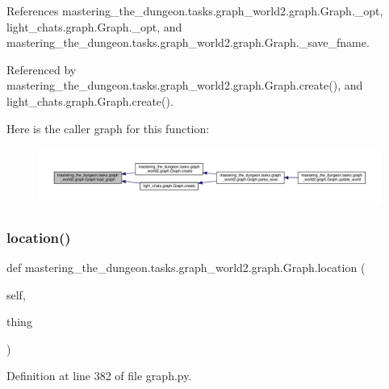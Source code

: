 References mastering\+\_\+the\+\_\+dungeon.\+tasks.\+graph\+\_\+world2.\+graph.\+Graph.\+\_\+opt, light\+\_\+chats.\+graph.\+Graph.\+\_\+opt, and mastering\+\_\+the\+\_\+dungeon.\+tasks.\+graph\+\_\+world2.\+graph.\+Graph.\+\_\+save\+\_\+fname.



Referenced by mastering\+\_\+the\+\_\+dungeon.\+tasks.\+graph\+\_\+world2.\+graph.\+Graph.\+create(), and light\+\_\+chats.\+graph.\+Graph.\+create().

Here is the caller graph for this function\+:
\nopagebreak
\begin{figure}[H]
\begin{center}
\leavevmode
\includegraphics[width=350pt]{classmastering__the__dungeon_1_1tasks_1_1graph__world2_1_1graph_1_1Graph_a99a3f4950b15400d0cc3d588302b8f84_icgraph}
\end{center}
\end{figure}
\mbox{\label{classmastering__the__dungeon_1_1tasks_1_1graph__world2_1_1graph_1_1Graph_a12a9049b513829474158738f5a3d57d8}} 
\subsubsection{\texorpdfstring{location()}{location()}}
{\footnotesize\ttfamily def mastering\+\_\+the\+\_\+dungeon.\+tasks.\+graph\+\_\+world2.\+graph.\+Graph.\+location (\begin{DoxyParamCaption}\item[{}]{self,  }\item[{}]{thing }\end{DoxyParamCaption})}



Definition at line 382 of file graph.\+py.



